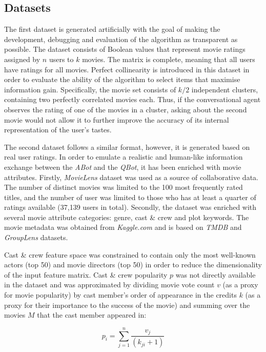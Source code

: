 \subsection{Datasets}
The first dataset is generated artificially with the goal of making the development, debugging and evaluation of the algorithm as transparent as possible. The dataset consists of Boolean values that represent movie ratings assigned by $n$ users to $k$ movies. The matrix is complete, meaning that all users have ratings for all movies. Perfect collinearity is introduced in this dataset in order to evaluate the ability of the algorithm to select items that maximise information gain. Specifically, the movie set consists of $k/2$ independent clusters, containing two perfectly correlated movies each. Thus, if the conversational agent observes the rating of one of the movies in a cluster, asking about the second movie would not allow it to further improve the accuracy of its internal representation of the user's tastes.

The second dataset follows a similar format, however, it is generated based on real user ratings. In order to emulate a realistic and human-like information exchange between the \textit{ABot} and the \textit{QBot}, it has been enriched with movie attributes. Firstly, \textit{MovieLens} dataset \citep{harper2015movielens} was used as a source of collaborative data. The number of distinct movies was limited to the 100 most frequently rated titles, and the number of user was limited to those who has at least a quarter of ratings available (37,139 users in total). Secondly, the dataset was enriched with several movie attribute categories: genre, cast \& crew and plot keywords. The movie metadata was obtained from \textit{Kaggle.com} and is based on \textit{TMDB} and \textit{GroupLens} datasets.

Cast \& crew feature space was constrained to contain only the most well-known actors (top 50) and movie directors (top 50) in order to reduce the dimensionality of the input feature matrix. Cast \& crew popularity $p$ was not directly available in the dataset and was approximated by dividing movie vote count $v$ (as a proxy for movie popularity) by cast member's order of appearance in the credits $k$ (as a proxy for their importance to the success of the movie) and summing over the movies $M$ that the cast member appeared in:

\begin{equation} 
\label{eq:cast_popularity}
p_{i}=\sum_{j=1}^{n}\frac{v_{j}}{(k_{ji}+1)}
\end{equation}

